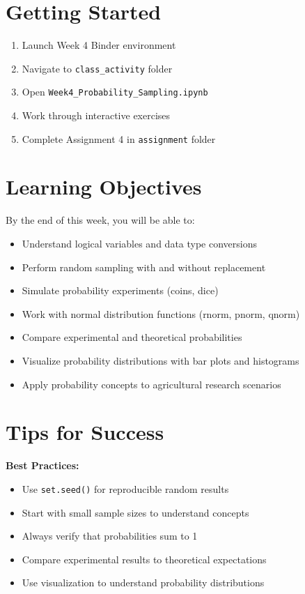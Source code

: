 \documentclass[11pt,a4paper]{article}
\begin{document}
\section{Getting Started}

\begin{enumerate}
    \item Launch Week 4 Binder environment
    \item Navigate to \texttt{class\_activity} folder
    \item Open \texttt{Week4\_Probability\_Sampling.ipynb}
    \item Work through interactive exercises
    \item Complete Assignment 4 in \texttt{assignment} folder
\end{enumerate}

\section{Learning Objectives}

By the end of this week, you will be able to:
\begin{itemize}
    \item Understand logical variables and data type conversions
    \item Perform random sampling with and without replacement
    \item Simulate probability experiments (coins, dice)
    \item Work with normal distribution functions (rnorm, pnorm, qnorm)
    \item Compare experimental and theoretical probabilities
    \item Visualize probability distributions with bar plots and histograms
    \item Apply probability concepts to agricultural research scenarios
\end{itemize}

\section{Tips for Success}

\begin{warningbox}
\textbf{Best Practices:}
\begin{itemize}
    \item Use \texttt{set.seed()} for reproducible random results
    \item Start with small sample sizes to understand concepts
    \item Always verify that probabilities sum to 1
    \item Compare experimental results to theoretical expectations
    \item Use visualization to understand probability distributions
\end{itemize}
\end{warningbox}
\end{document}
